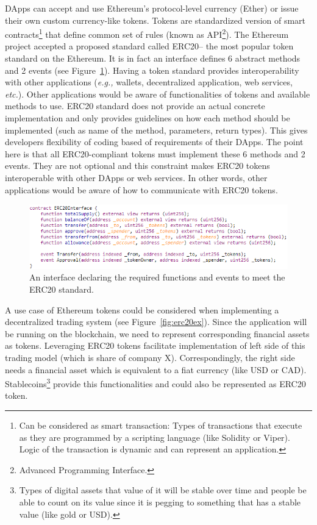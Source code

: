 DApps can accept and use Ethereum’s protocol-level currency (Ether) or issue their own custom currency-like tokens. Tokens are standardized version of smart contracts\footnote{Can be considered as smart transaction: Types of transactions that execute as they are programmed by a scripting language (like Solidity or Viper). Logic of the transaction is dynamic and can represent an application.} that define common set of rules (known as API\footnote{Advanced Programming Interface.}). The Ethereum project accepted a proposed standard called ERC20-- the most popular token standard on the Ethereum. It is in fact an interface defines 6 abstract methods and 2 events (see Figure~\ref{fig:erc20api}). Having a token standard provides interoperability with other applications (\textit{e.g.,} wallets, decentralized application, web services, \textit{etc.}). Other applications would be aware of functionalities of tokens and available methods to use. ERC20 standard does not provide an actual concrete implementation and only provides guidelines on how each method should be implemented (such as name of the method, parameters, return types). This gives developers flexibility of coding based of requirements of their DApps. The point here is that all ERC20-compliant tokens must implement these 6 methods and 2 events. They are not optional and this constraint makes ERC20 tokens interoperable with other DApps or web services. In other words, other applications would be aware of how to communicate with ERC20 tokens. 

\begin{figure}[t]
	\centering
	\includegraphics[width=0.8\linewidth]{figures/img02.png}
	\caption{An interface declaring the required functions and events to meet the ERC20 standard.}
	\label{fig:erc20api}
\end{figure}

A use case of Ethereum tokens could be considered when implementing a decentralized trading system (see Figure~\ref{fig:erc20ex}). Since the application will be running on the blockchain, we need to represent corresponding financial assets as tokens. Leveraging ERC20 tokens facilitate implementation of left side of this trading model (which is share of company X). Correspondingly, the right side needs a financial asset which is equivalent to a fiat currency (like USD or CAD). Stablecoins\footnote{Types of digital assets that value of it will be stable over time and people be able to count on its value since it is pegging to something that has a stable value (like gold or USD).} provide this functionalities and could also be represented as ERC20 token.

